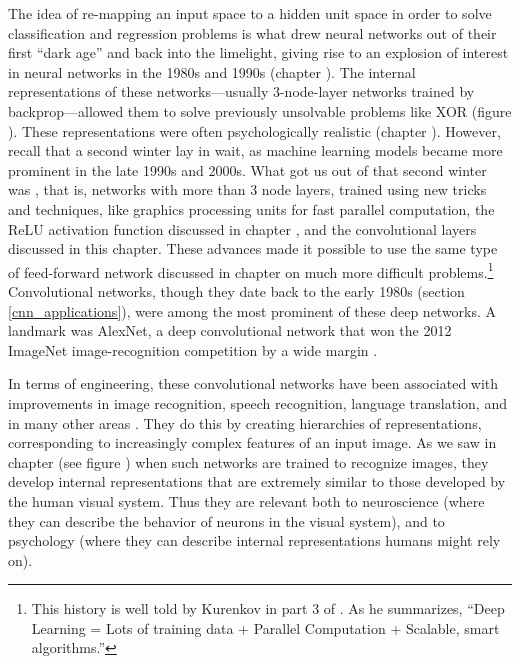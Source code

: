 The idea of re-mapping an input space to a hidden unit space in order to solve classification and regression problems is what drew neural networks out of their first ``dark age'' and back into the limelight, giving rise to an explosion of interest in neural networks in the 1980s and 1990s (chapter ). The internal representations of these networks---usually 3-node-layer networks trained by backprop---allowed them to solve previously unsolvable problems like XOR (figure ). These representations were often psychologically realistic (chapter ). However, recall that a second winter lay in wait, as machine learning models became more prominent in the late 1990s and 2000s. What got us out of that second winter was , that is, networks with more than 3 node layers, trained using new tricks and techniques, like graphics processing units for fast parallel computation, the ReLU activation function discussed in chapter , and the convolutional layers discussed in this chapter. These advances made it possible to use the same type of feed-forward network discussed in chapter  on much more difficult problems.\footnote{This history is well told by Kurenkov in part 3 of . As he summarizes, ``Deep Learning = Lots of training data + Parallel Computation + Scalable, smart algorithms.''} Convolutional networks, though they date back to the early 1980s (section \ref{cnn_applications}), were among the most prominent of these deep networks. A landmark was AlexNet, a deep convolutional network that won the 2012 ImageNet image-recognition competition by a wide margin \cite{krizhevsky2012imagenet}.

In terms of engineering, these convolutional networks have been associated with improvements in image recognition, speech recognition, language translation, and in many other areas \cite{lecun2015deep, goodfellow2016deep}. They do this by creating hierarchies of representations, corresponding  to increasingly complex features of an input image. As we saw in chapter  (see figure ) when such networks are trained to recognize images, they develop internal representations that are extremely similar to those developed by the human visual  system. Thus they are relevant both to neuroscience (where they can describe the behavior of neurons in the visual system), and to psychology (where they can describe internal representations humans might rely on).

